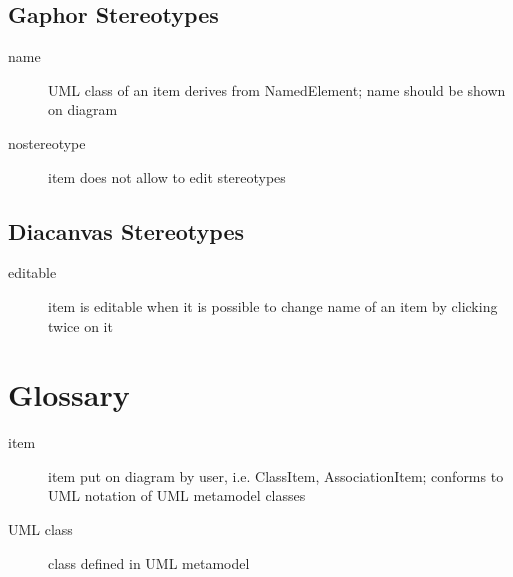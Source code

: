 \documentclass[draft]{article}
\begin{document}
\subsection{Gaphor Stereotypes}

\begin{description}
\item[name] UML class of an item derives from NamedElement; name
        should be shown on diagram
\item[nostereotype] item does not allow to edit stereotypes
\end{description}

\subsection{Diacanvas Stereotypes}

\begin{description}
\item[editable] item is editable when it is possible to change name of an
    item by clicking twice on it
\end{description}


\section{Glossary}

\begin{description}
\item[item]
    item put on diagram by user, i.e. ClassItem, AssociationItem;
    conforms to UML notation of UML metamodel classes

\item[UML class]
    class defined in UML metamodel
\end{description}
\end{document}
